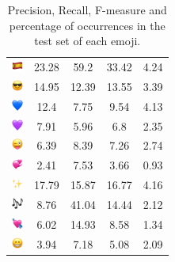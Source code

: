 \documentclass{article}
\begin{document}
\begin{table}
\begin{tabular}{|c|ccc|c|}
\includegraphics[height=0.37cm,width=0.37cm]{img/Spain.png} & 23.28 & 59.2 & 33.42 & 4.24\\ 
\includegraphics[height=0.37cm,width=0.37cm]{img/smiling_face_with_sunglasses.png} & 14.95 & 12.39 & 13.55 & 3.39\\ 
\includegraphics[height=0.37cm,width=0.37cm]{img/blue_heart.png} & 12.4 & 7.75 & 9.54 & 4.13\\ 
\includegraphics[height=0.37cm,width=0.37cm]{img/purple_heart.png} & 7.91 & 5.96 & 6.8 & 2.35\\ 
\includegraphics[height=0.37cm,width=0.37cm]{img/winking_face_with_tongue.png} & 6.39 & 8.39 & 7.26 & 2.74\\ 
\includegraphics[height=0.37cm,width=0.37cm]{img/revolving_hearts.png} & 2.41 & 7.53 & 3.66 & 0.93\\ 
\includegraphics[height=0.37cm,width=0.37cm]{img/sparkles.png} & 17.79 & 15.87 & 16.77 & 4.16\\ 
\includegraphics[height=0.37cm,width=0.37cm]{img/musical_notes.png} & 8.76 & 41.04 & 14.44 & 2.12\\ 
\includegraphics[height=0.37cm,width=0.37cm]{img/heart_with_arrow.png} & 6.02 & 14.93 & 8.58 & 1.34\\ 
\includegraphics[height=0.37cm,width=0.37cm]{img/beaming_face_with_smiling_eyes.png} & 3.94 & 7.18 & 5.08 & 2.09\\ 

\hline
\end{tabular}
\caption{\label{table:emoji_detailed} Precision, Recall, F-measure and percentage of occurrences in the test set of each emoji.}
\end{table}
\end{document}
